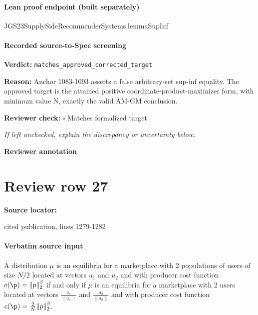 \documentclass[10pt]{article}
\newcommand{\reviewerbox}{%
  \par\noindent\fbox{\parbox{0.96\linewidth}{\rule{0pt}{0.38in}}}\par
}
\newcommand{\reviewmatch}[1]{%
  \par\noindent\textbf{Reviewer check:} $\square$\; #1\par
  \noindent\emph{If left unchecked, explain the discrepancy or uncertainty below.}\par
}
\begin{document}
\paragraph{Lean proof endpoint (built separately)}\begin{ReviewVerbatim}
JGS23SupplySideRecommenderSystems.lemmaSupInf
\end{ReviewVerbatim}

\paragraph{Recorded source-to-Spec screening}
\textbf{Verdict:} \texttt{matches\_approved\_corrected\_target}
\\
{\raggedright
\textbf{Reason:} Anchor 1083-\allowbreak{}1093 asserts a false arbitrary-\allowbreak{}set sup-\allowbreak{}inf equality.\allowbreak{}  The approved target is the attained positive coordinate-\allowbreak{}product-\allowbreak{}maximizer form, with minimum value N, exactly the valid AM-\allowbreak{}GM conclusion.\allowbreak{}
\par}
\reviewmatch{Matches formalized target}
\noindent\textbf{Reviewer annotation}\par
\reviewerbox
\clearpage
\hypertarget{source-claim-c369fc48e6142226}{}
\section*{Review row 27}
\textbf{Source locator:} {\footnotesize\raggedright cited publication, lines 1279-\allowbreak{}1282\par}
\paragraph{Verbatim source input}
\begin{ReviewVerbatim}
\begin{claim}
\label{claim:equivalence}
A distribution $\mu$ is an equilibria for a marketplace with 2 populations of users of size $N/2$ located at vectors $u_1$ and $u_2$ and with producer cost function $c(\p) = \|p\|_2^{\beta}$ if and only if $\mu$ is an equilibria for a marketplace with 2 users located at vectors $\frac{u_1}{\|u_1\|}$ and $\frac{u_2}{\|u_2\|}$ and with producer cost function $c(\p) = \frac{2}{N} \|p\|_2^{\beta}$.
\end{claim}
\end{ReviewVerbatim}
\end{document}
